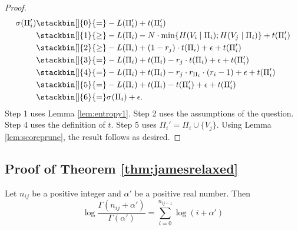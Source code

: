\documentclass[letterpaper]{article}
\newcommand{\score}[2]{\sigma_{#1}({#2})}
\newenvironment{customlem}[1]
  {\renewcommand\theinnercustomlem{#1}\innercustomlem}
  {\endinnercustomlem}
\begin{document}
\begin{proof}
\begin{align*}
    \score{}{\Pi_i'} 
                    &\stackbin[]{0}{=} -L(\Pi_i')  +  t(\Pi_i')\\
                    &\stackbin[]{1}{\geq} -L(\Pi_i) - N \cdot \min\{H(V_i \mid \Pi_i); H(V_j \mid \Pi_i)\} + t(\Pi_i')\\
                    &\stackbin[]{2}{\geq} -L(\Pi_i) + (1 - r_j)\cdot t(\Pi_i) +\epsilon  +t(\Pi_i') \\
                    &\stackbin[]{3}{=} -L(\Pi_i) + t(\Pi_i) - r_j \cdot t(\Pi_i) + \epsilon + t(\Pi_i') \\
                    &\stackbin[]{4}{=} -L(\Pi_i) + t(\Pi_i) - r_j \cdot r_{\Pi_i} \cdot (r_i -1) + \epsilon + t(\Pi_i') \\
                    &\stackbin[]{5}{=} -L(\Pi_i) + t(\Pi_i) - t(\Pi_i') + \epsilon + t(\Pi_i') \\
                    &\stackbin[]{6}{=} \score{}{\Pi_i} + \epsilon.
\end{align*}
Step 1 uses Lemma \ref{lem:entropy1}. Step 2 uses the assumptions of the question. Step 4 uses the definition of $t$. Step 5 uses $\Pi_i' = \Pi_i \cup \{V_j \}$. Using Lemma \ref{lem:scoreprune}, the result follows as desired.
\end{proof}



\subsection{Proof of Theorem \ref{thm:jamesrelaxed}}

\begin{customlem}{6A}
Let $n_{ij}$ be a positive integer and $\alpha'$ be a positive real number. Then
\begin{equation*}
    \log \frac{\Gamma(n_{ij} + \alpha')}{\Gamma(\alpha')} = \sum_{i=0}^{n_{ij -1}}\log (i + \alpha')
\end{equation*} \label{lem:gamma}
\end{customlem}
\end{document}
